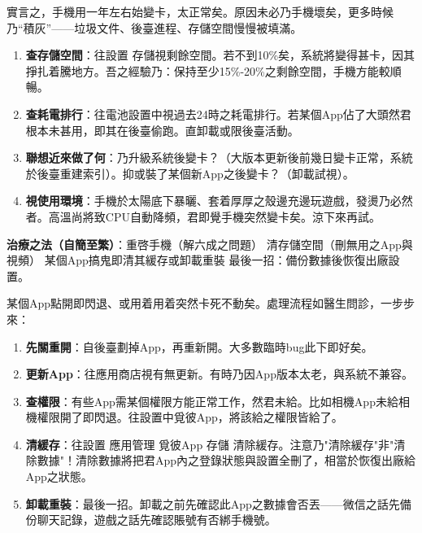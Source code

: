 


實言之，手機用一年左右始變卡，太正常矣。原因未必乃手機壞矣，更多時候乃“積灰”——垃圾文件、後臺進程、存儲空間慢慢被填滿。


\begin{enumerate}
  \item \textbf{查存儲空間}：往設置 存儲視剩餘空間。若不到10\%矣，系統將變得甚卡，因其掙扎着騰地方。吾之經驗乃：保持至少15\%-20\%之剩餘空間，手機方能較順暢。
  \item \textbf{查耗電排行}：往電池設置中視過去24時之耗電排行。若某個App佔了大頭然君根本未甚用，即其在後臺偷跑。直卸載或限後臺活動。
  \item \textbf{聯想近來做了何}：乃升級系統後變卡？（大版本更新後前幾日變卡正常，系統於後臺重建索引）。抑或裝了某個新App之後變卡？（卸載試視）。
  \item \textbf{視使用環境}：手機於太陽底下暴曬、套着厚厚之殼邊充邊玩遊戲，發燙乃必然者。高溫尚將致CPU自動降頻，君即覺手機突然變卡矣。涼下來再試。
\end{enumerate}

\textbf{治療之法（自簡至繁）}：重啓手機（解六成之問題） 清存儲空間（刪無用之App與視頻） 某個App搞鬼即清其緩存或卸載重裝 最後一招：備份數據後恢復出廠設置。


某個App點開即閃退、或用着用着突然卡死不動矣。處理流程如醫生問診，一步步來：

\begin{enumerate}
  \item \textbf{先關重開}：自後臺劃掉App，再重新開。大多數臨時bug此下即好矣。
  \item \textbf{更新App}：往應用商店視有無更新。有時乃因App版本太老，與系統不兼容。
  \item \textbf{查權限}：有些App需某個權限方能正常工作，然君未給。比如相機App未給相機權限開了即閃退。往設置中覓彼App，將該給之權限皆給了。
  \item \textbf{清緩存}：往設置 應用管理 覓彼App 存儲 清除緩存。注意乃"清除緩存"非"清除數據"！清除數據將把君App內之登錄狀態與設置全刪了，相當於恢復出廠給App之狀態。
  \item \textbf{卸載重裝}：最後一招。卸載之前先確認此App之數據會否丟——微信之話先備份聊天記錄，遊戲之話先確認賬號有否綁手機號。
\end{enumerate}

